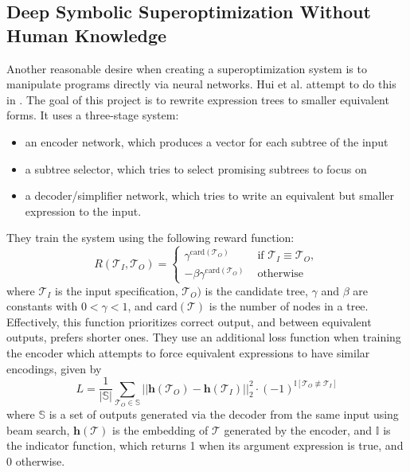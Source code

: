 \documentclass[12pt,twoside]{reedthesis}
\begin{document}
        \subsection{Deep Symbolic Superoptimization Without Human Knowledge}
            Another reasonable desire when creating a superoptimization system is to manipulate programs directly via neural networks.
            Hui et al. attempt to do this in \cite{hui2020deep}. 
            The goal of this project is to rewrite expression trees to smaller equivalent forms. 
            It uses a three-stage system:
            \begin{itemize}
                \item an encoder network\footnotemark, which produces a vector for each subtree of the input
                \item a subtree selector, which tries to select promising subtrees to focus on
                \item a decoder/simplifier network, which tries to write an equivalent but smaller expression to the input.
            \end{itemize}
            
            
            They train the system using the following reward function:
            \[
                R(\mathcal{T}_I,\mathcal{T}_O) =
                    \begin{cases}
                        \gamma^{\text{card}(\mathcal{T}_O)} & \text{ if } \mathcal{T}_I \equiv \mathcal{T}_O,
                    \\ -\beta\gamma^{\text{card}(\mathcal{T}_O)} & \text{ otherwise}
                    \end{cases}
            \] %
            where $\mathcal{T}_I$ is the input specification, $\mathcal{T}_O)$ is the candidate tree, $\gamma$ and $\beta$ are constants with $0 < \gamma < 1$, and $\text{card}(\mathcal{T})$ is the number of nodes in a tree.
            Effectively, this function prioritizes correct output, and between equivalent outputs, prefers shorter ones.
            They use an additional loss function when training the encoder which attempts to force equivalent expressions to have similar encodings, given by
            \[
                L = \frac{1}{|\mathbb{S}|} \sum_{\mathcal{T}_O \in \mathbb{S}} || \boldsymbol{h}(\mathcal{T}_O) - \boldsymbol{h}(\mathcal{T}_I) ||^2_2 \cdot (-1)^{\mathbb{I}[\mathcal{T}_O \not\equiv \mathcal{T}_I]}
            \]
            where $\mathbb{S}$ is a set of outputs generated via the decoder from the same input using beam search\footnotemark, $\boldsymbol{h}(\mathcal{T})$ is the embedding of $\mathcal{T}$ generated by the encoder, and $\mathbb{I}$ is the indicator function, which returns 1 when its argument expression is true, and 0 otherwise.
            
\end{document}
